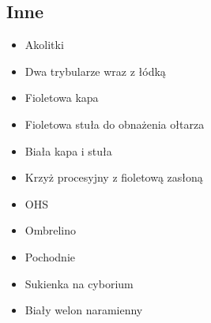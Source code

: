 

\subsection{Inne}

\begin{itemize}
    \item Akolitki
    \item Dwa trybularze wraz z łódką
    \item {\color{violet} Fioletowa} kapa
    \item {\color{violet} Fioletowa} stuła do obnażenia ołtarza 
    \item Biała kapa i stuła
    \item Krzyż procesyjny z {\color{violet} fioletową} zasłoną
    \item OHS
    \item Ombrelino
    \item Pochodnie
    \item Sukienka na cyborium
    \item Biały welon naramienny
\end{itemize}
